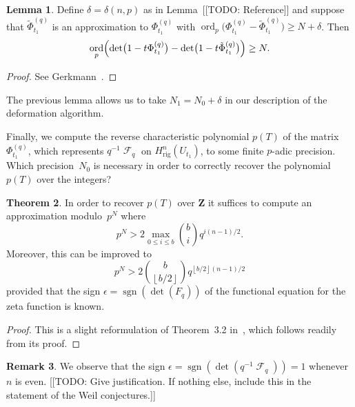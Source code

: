 \documentclass[a4paper,11pt]{article}
\numberwithin{equation}{section}
\providecommand{\floor}[1]{\left\lfloor#1\right\rfloor}   %
\DeclareMathOperator{\ord}{ord}          %
\DeclareMathOperator{\sgn}{sgn}          %
\DeclareMathOperator{\Frob}{\mathcal{F}} %
\providecommand{\Hrig}{H_{\text{rig}}}  %
\theoremstyle{definition}
\newtheorem{thm}{Theorem}[section]
\newtheorem{lem}[thm]{Lemma}
\newtheorem{rem}[thm]{Remark}
\begin{document}
\begin{lem}
Define $\delta = \delta(n,p)$ as in Lemma~[[TODO: Reference]] and 
suppose that $\tilde{\Phi}_{t_1}^{(q)}$ is an approximation to 
$\Phi_{t_1}^{(q)}$ with 
$\ord_p\bigl(\Phi_{t_1}^{(q)}-\tilde{\Phi}_{t_1}^{(q)}\bigr) \geq N + \delta$.
Then 
\begin{equation}
\ord_p \Bigl( \det\bigl(1 - t \Phi_{t_1}^{(q)}\bigr) 
            - \det\bigl(1 - t \tilde{\Phi}_{t_1}^{(q)}\bigr) \Bigr) \geq N.
\end{equation}
\end{lem}

\begin{proof} 
See Gerkmann~\citep[Lemma~3.3, Lemma~3.4]{Gerkmann2007}.
\end{proof}

The previous lemma allows us to take $N_1 = N_0 + \delta$ in our 
description of the deformation algorithm.

Finally, we compute the 
reverse characteristic polynomial $p(T)$ of the matrix $\Phi_{t_1}^{(q)}$, 
which represents $q^{-1} \Frob_q$ on $\Hrig^n(U_{t_1})$, to some finite 
$p$-adic precision.  Which precision~$N_0$ is necessary in order to 
correctly recover the polynomial~$p(T)$ over the integers?

\begin{thm} \label{thm:N0}
In order to recover $p(T)$ over $\mathbf{Z}$ it suffices to compute 
an approximation modulo~$p^N$ where 
\begin{equation}
p^N > 2 \max_{0 \leq i \leq b} \binom{b}{i} q^{i (n-1) / 2}.
\end{equation}
Moreover, this can be improved to 
\begin{equation}
p^N > 2 \binom{b}{\floor{b/2}} q^{\floor{b/2} (n-1) / 2}
\end{equation}
provided that the sign $\epsilon = \sgn(\det(F_q))$ of the 
functional equation for the zeta function is known.
\end{thm}

\begin{proof}
This is a slight reformulation of {Theorem~3.2} in~\citep{Gerkmann2007}, 
which follows readily from its proof.
\end{proof}

\begin{rem}
We observe that the sign $\epsilon = \sgn(\det(q^{-1} \Frob_q)) = 1$ 
whenever $n$ is even.  [[TODO: Give justification.  If nothing else, 
include this in the statement of the Weil conjectures.]]
\end{rem}
\end{document}
